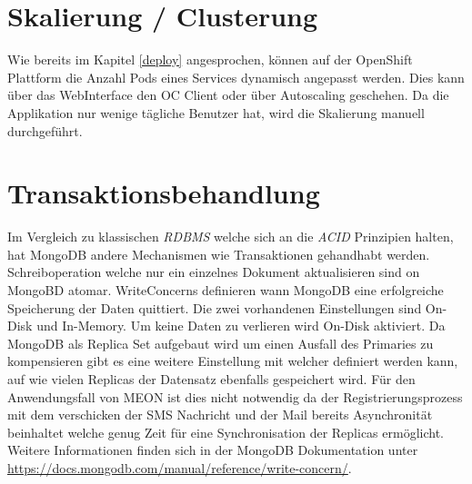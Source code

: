 \section{Skalierung / Clusterung}

Wie bereits im Kapitel \ref{deploy} angesprochen, können auf der OpenShift Plattform die Anzahl Pods eines Services dynamisch angepasst werden. Dies kann über das WebInterface den OC Client oder über Autoscaling geschehen. Da die Applikation nur wenige tägliche Benutzer hat, wird die Skalierung manuell durchgeführt.

\section{Transaktionsbehandlung}
\label{transactions}
Im Vergleich zu klassischen \textit{\gls{RDBMS}} welche sich an die \textit{\gls{ACID}} Prinzipien halten, hat MongoDB andere Mechanismen wie Transaktionen gehandhabt werden. Schreiboperation welche nur ein einzelnes Dokument aktualisieren sind on MongoBD atomar. WriteConcerns definieren wann MongoDB eine erfolgreiche Speicherung der Daten quittiert. Die zwei vorhandenen Einstellungen sind On-Disk und In-Memory. Um keine Daten zu verlieren wird On-Disk aktiviert.\newline
Da MongoDB als Replica Set aufgebaut wird um einen Ausfall des Primaries zu kompensieren gibt es eine weitere Einstellung mit welcher definiert werden kann, auf wie vielen Replicas der Datensatz ebenfalls gespeichert wird. Für den Anwendungsfall von MEON ist dies nicht notwendig da der Registrierungsprozess mit dem verschicken der SMS Nachricht und der Mail bereits Asynchronität beinhaltet welche genug Zeit für eine Synchronisation der Replicas ermöglicht. Weitere Informationen finden sich in der MongoDB Dokumentation unter \url{https://docs.mongodb.com/manual/reference/write-concern/}.
